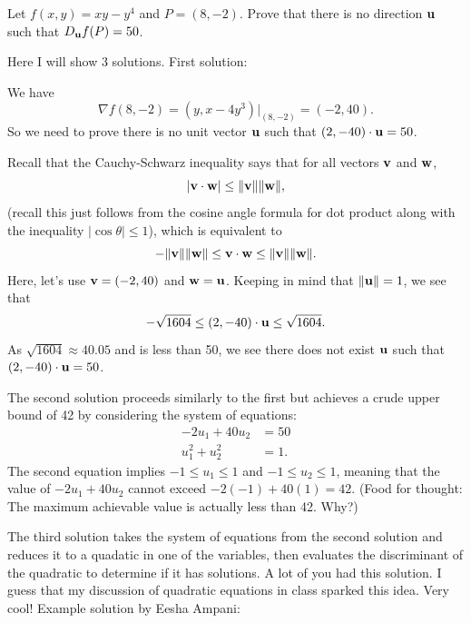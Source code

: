 \begin{problem}
  Let $f(x,y)=xy-y^4$ and $P=(8,-2)$. Prove that there is no direction $\mathbf u$ such that $D_\mathbf u f(P)=50$.
\end{problem}
\begin{solution}
  Here I will show 3 solutions. First solution:

  We have
  \[\nabla f(8,-2)=(y,x-4y^3)\Big|_{(8,-2)}=(-2,40).\]
  So we need to prove there is no unit vector $\mathbf u$ such that $(2,-40)\cdot\mathbf u=50$.

  Recall that the Cauchy-Schwarz inequality says that for all vectors $\mathbf v$ and $\mathbf w$,
  \[|\mathbf v\cdot \mathbf w|\leq\|\mathbf v\|\|\mathbf w\|,\]
  (recall this just follows from the cosine angle formula for dot product along with the inequality $|\cos\theta|\leq 1$), which is equivalent to
  \[-\|\mathbf v\|\|\mathbf w\|\leq \mathbf v\cdot \mathbf w\leq \|\mathbf v\|\|\mathbf w\|.\]
  Here, let's use $\mathbf v=(-2,40)$ and $\mathbf w=\mathbf u$. Keeping in mind that $\|\mathbf u\|=1$, we see that
  \[-\sqrt{1604}\leq (2,-40)\cdot\mathbf u\leq\sqrt{1604}.\]
  As $\sqrt{1604}\approx 40.05$ and is less than 50, we see there does not exist $\mathbf u$ such that $(2,-40)\cdot\mathbf u=50$.

  The second solution proceeds similarly to the first but achieves a crude upper bound of 42 by considering the system of equations:
  \begin{align*}
    -2u_1+40u_2 &= 50\\
    u_1^2+u_2^2 &= 1.
  \end{align*}
  The second equation implies $-1\leq u_1\leq 1$ and $-1\leq u_2\leq 1$, meaning that the value of $-2u_1+40u_2$ cannot exceed $-2(-1)+40(1)=42$. (Food for thought: The maximum achievable value is actually less than 42. Why?)

  The third solution takes the system of equations from the second solution and reduces it to a quadatic in one of the variables, then evaluates the discriminant of the quadratic to determine if it has solutions. A lot of you had this solution. I guess that my discussion of quadratic equations in class sparked this idea. Very cool! Example solution by Eesha Ampani:


\end{solution}
